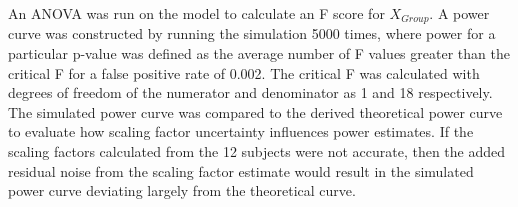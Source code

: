 An ANOVA was run on the model to calculate an F score for $X_{Group}$. A power curve was constructed by running the simulation 5000 times, where power for a particular p-value was defined as the average number of F values greater than the critical F for a false positive rate of 0.002. The critical F was calculated with degrees of freedom of the numerator and denominator as 1 and 18 respectively. The simulated power curve was compared to the derived theoretical power curve to evaluate how scaling factor uncertainty influences power estimates. If the scaling factors calculated from the 12 subjects were not accurate, then the added residual noise from the scaling factor estimate would result in the simulated power curve deviating largely from the theoretical curve.
